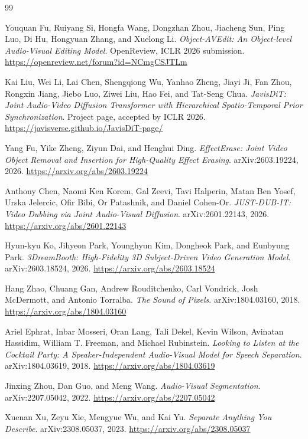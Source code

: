 \begin{thebibliography}{99}

Youquan Fu, Ruiyang Si, Hongfa Wang, Dongzhan Zhou, Jiacheng Sun, Ping Luo, Di Hu, Hongyuan Zhang, and Xuelong Li.
\textit{Object-AVEdit: An Object-level Audio-Visual Editing Model}.
OpenReview, ICLR 2026 submission.
\url{https://openreview.net/forum?id=NCmgCSJTLm}

Kai Liu, Wei Li, Lai Chen, Shengqiong Wu, Yanhao Zheng, Jiayi Ji, Fan Zhou, Rongxin Jiang, Jiebo Luo, Ziwei Liu, Hao Fei, and Tat-Seng Chua.
\textit{JavisDiT: Joint Audio-Video Diffusion Transformer with Hierarchical Spatio-Temporal Prior Synchronization}.
Project page, accepted by ICLR 2026.
\url{https://javisverse.github.io/JavisDiT-page/}

Yang Fu, Yike Zheng, Ziyun Dai, and Henghui Ding.
\textit{EffectErase: Joint Video Object Removal and Insertion for High-Quality Effect Erasing}.
arXiv:2603.19224, 2026.
\url{https://arxiv.org/abs/2603.19224}

Anthony Chen, Naomi Ken Korem, Gal Zeevi, Tavi Halperin, Matan Ben Yosef, Urska Jelercic, Ofir Bibi, Or Patashnik, and Daniel Cohen-Or.
\textit{JUST-DUB-IT: Video Dubbing via Joint Audio-Visual Diffusion}.
arXiv:2601.22143, 2026.
\url{https://arxiv.org/abs/2601.22143}

Hyun-kyu Ko, Jihyeon Park, Younghyun Kim, Dongheok Park, and Eunbyung Park.
\textit{3DreamBooth: High-Fidelity 3D Subject-Driven Video Generation Model}.
arXiv:2603.18524, 2026.
\url{https://arxiv.org/abs/2603.18524}

Hang Zhao, Chuang Gan, Andrew Rouditchenko, Carl Vondrick, Josh McDermott, and Antonio Torralba.
\textit{The Sound of Pixels}.
arXiv:1804.03160, 2018.
\url{https://arxiv.org/abs/1804.03160}

Ariel Ephrat, Inbar Mosseri, Oran Lang, Tali Dekel, Kevin Wilson, Avinatan Hassidim, William T. Freeman, and Michael Rubinstein.
\textit{Looking to Listen at the Cocktail Party: A Speaker-Independent Audio-Visual Model for Speech Separation}.
arXiv:1804.03619, 2018.
\url{https://arxiv.org/abs/1804.03619}

Jinxing Zhou, Dan Guo, and Meng Wang.
\textit{Audio-Visual Segmentation}.
arXiv:2207.05042, 2022.
\url{https://arxiv.org/abs/2207.05042}

Xuenan Xu, Zeyu Xie, Mengyue Wu, and Kai Yu.
\textit{Separate Anything You Describe}.
arXiv:2308.05037, 2023.
\url{https://arxiv.org/abs/2308.05037}


\end{thebibliography}
